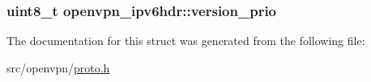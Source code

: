 \subsubsection[{version\+\_\+prio}]{\setlength{\rightskip}{0pt plus 5cm}uint8\+\_\+t openvpn\+\_\+ipv6hdr\+::version\+\_\+prio}\label{structopenvpn__ipv6hdr_a0da30a8309dca7c55db02fa08029733b}


The documentation for this struct was generated from the following file\+:\begin{DoxyCompactItemize}
\item 
src/openvpn/\hyperlink{proto_8h}{proto.\+h}\end{DoxyCompactItemize}
